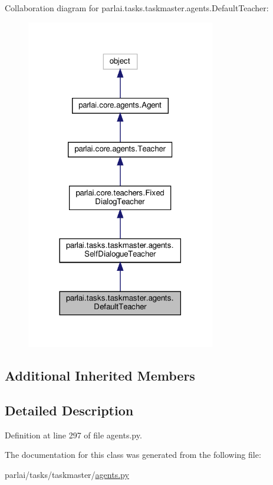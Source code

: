 Collaboration diagram for parlai.\+tasks.\+taskmaster.\+agents.\+Default\+Teacher\+:\nopagebreak
\begin{figure}[H]
\begin{center}
\leavevmode
\includegraphics[width=234pt]{df/d66/classparlai_1_1tasks_1_1taskmaster_1_1agents_1_1DefaultTeacher__coll__graph}
\end{center}
\end{figure}
\subsection*{Additional Inherited Members}


\subsection{Detailed Description}


Definition at line 297 of file agents.\+py.



The documentation for this class was generated from the following file\+:\begin{DoxyCompactItemize}
\item 
parlai/tasks/taskmaster/\hyperlink{parlai_2tasks_2taskmaster_2agents_8py}{agents.\+py}\end{DoxyCompactItemize}
